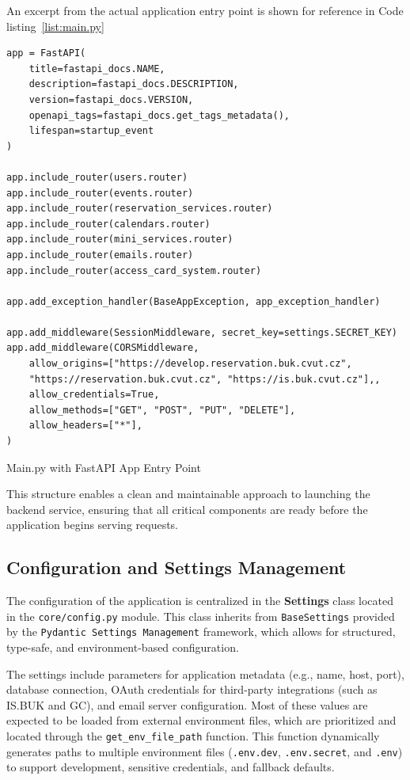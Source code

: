 An excerpt from the actual application entry point is shown for reference in Code listing~\ref{list:main.py}

\begin{listing}[t]
  \begin{verbatim}
app = FastAPI(
    title=fastapi_docs.NAME,
    description=fastapi_docs.DESCRIPTION,
    version=fastapi_docs.VERSION,
    openapi_tags=fastapi_docs.get_tags_metadata(),
    lifespan=startup_event
)

app.include_router(users.router)
app.include_router(events.router)
app.include_router(reservation_services.router)
app.include_router(calendars.router)
app.include_router(mini_services.router)
app.include_router(emails.router)
app.include_router(access_card_system.router)

app.add_exception_handler(BaseAppException, app_exception_handler)

app.add_middleware(SessionMiddleware, secret_key=settings.SECRET_KEY)
app.add_middleware(CORSMiddleware,
    allow_origins=["https://develop.reservation.buk.cvut.cz", 
    "https://reservation.buk.cvut.cz", "https://is.buk.cvut.cz"],,
    allow_credentials=True,
    allow_methods=["GET", "POST", "PUT", "DELETE"],
    allow_headers=["*"],
)
\end{verbatim}
\caption{Main.py with FastAPI App Entry Point}
\label{list:main.py}
\end{listing}

This structure enables a clean and maintainable approach to launching the backend service, ensuring that all critical components are ready before the application begins serving requests.

\newpage

\subsection{Configuration and Settings Management}

The configuration of the application is centralized in the \textbf{Settings} class located in the \texttt{core/config.py} module. This class inherits from \texttt{BaseSettings} provided by the \texttt{Pydantic Settings Management} framework, which allows for structured, type-safe, and environment-based configuration.

The settings include parameters for application metadata (e.g., name, host, port), database connection, OAuth credentials for third-party integrations (such as IS.BUK and GC), and email server configuration. Most of these values are expected to be loaded from external environment files, which are prioritized and located through the \texttt{get\_env\_file\_path} function. This function dynamically generates paths to multiple environment files (\texttt{.env.dev}, \texttt{.env.secret}, and \texttt{.env}) to support development, sensitive credentials, and fallback defaults.

